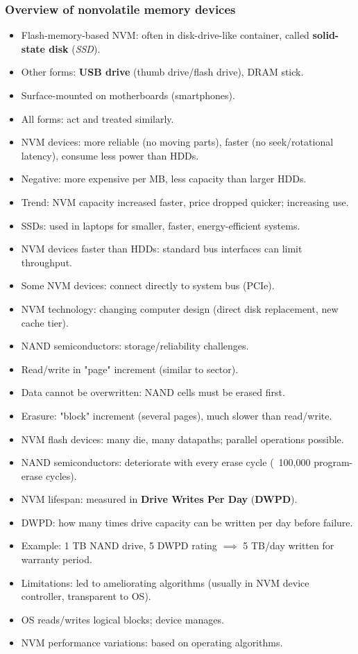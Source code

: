 \subsubsection{Overview of nonvolatile memory devices}
\begin{itemize}
    \item Flash-memory-based NVM: often in disk-drive-like container, called \textbf{solid-state disk} (\textit{SSD}).
    \item Other forms: \textbf{USB drive} (thumb drive/flash drive), DRAM stick.
    \item Surface-mounted on motherboards (smartphones).
    \item All forms: act and treated similarly.
    \item NVM devices: more reliable (no moving parts), faster (no seek/rotational latency), consume less power than HDDs.
    \item Negative: more expensive per MB, less capacity than larger HDDs.
    \item Trend: NVM capacity increased faster, price dropped quicker; increasing use.
    \item SSDs: used in laptops for smaller, faster, energy-efficient systems.
    \item NVM devices faster than HDDs: standard bus interfaces can limit throughput.
    \item Some NVM devices: connect directly to system bus (PCIe).
    \item NVM technology: changing computer design (direct disk replacement, new cache tier).
    \item NAND semiconductors: storage/reliability challenges.
    \item Read/write in "page" increment (similar to sector).
    \item Data cannot be overwritten: NAND cells must be erased first.
    \item Erasure: "block" increment (several pages), much slower than read/write.
    \item NVM flash devices: many die, many datapaths; parallel operations possible.
    \item NAND semiconductors: deteriorate with every erase cycle (~100,000 program-erase cycles).
    \item NVM lifespan: measured in \textbf{Drive Writes Per Day} (\textbf{DWPD}).
    \item DWPD: how many times drive capacity can be written per day before failure.
    \item Example: 1 TB NAND drive, 5 DWPD rating $\implies$ 5 TB/day written for warranty period.
    \item Limitations: led to ameliorating algorithms (usually in NVM device controller, transparent to OS).
    \item OS reads/writes logical blocks; device manages.
    \item NVM performance variations: based on operating algorithms.
\end{itemize}

